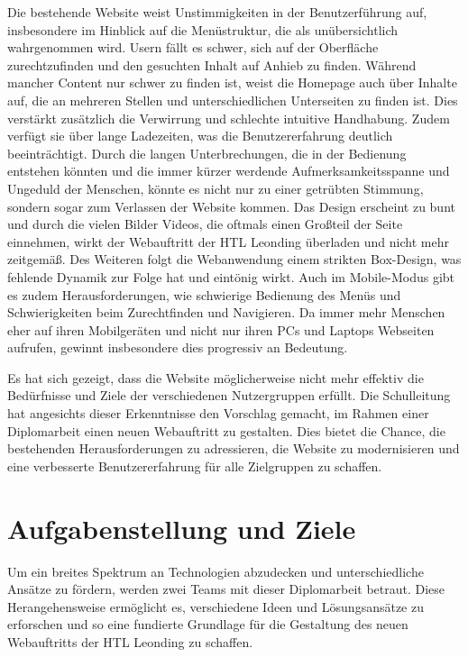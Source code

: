Die bestehende Website weist Unstimmigkeiten in der Benutzerführung auf, 
insbesondere im Hinblick auf die Menüstruktur, die als unübersichtlich wahrgenommen wird. 
Usern fällt es schwer, sich auf der Oberfläche zurechtzufinden und den gesuchten Inhalt auf Anhieb zu finden. 
Während mancher Content nur schwer zu finden ist, weist die Homepage auch über Inhalte auf, 
die an mehreren Stellen und unterschiedlichen Unterseiten zu finden ist. Dies verstärkt zusätzlich 
die Verwirrung und schlechte intuitive Handhabung. Zudem verfügt sie über lange Ladezeiten, was die 
Benutzererfahrung deutlich beeinträchtigt. Durch die langen Unterbrechungen, 
die in der Bedienung entstehen könnten und die immer kürzer werdende Aufmerksamkeitsspanne und Ungeduld der Menschen, 
könnte es nicht nur zu einer getrübten Stimmung, sondern sogar zum Verlassen der Website kommen. Das Design erscheint 
zu bunt und durch die vielen Bilder Videos, die oftmals einen Großteil der Seite einnehmen, 
wirkt der Webauftritt der HTL Leonding überladen und nicht mehr zeitgemäß. Des Weiteren folgt die Webanwendung einem strikten
Box-Design, was fehlende Dynamik zur Folge hat und eintönig wirkt. Auch im Mobile-Modus gibt es zudem Herausforderungen,
wie schwierige Bedienung des Menüs und Schwierigkeiten beim Zurechtfinden und Navigieren. Da immer mehr Menschen eher auf 
ihren Mobilgeräten und nicht nur ihren PCs und Laptops Webseiten aufrufen, gewinnt insbesondere dies progressiv an Bedeutung.

Es hat sich gezeigt, dass die Website möglicherweise nicht mehr effektiv die Bedürfnisse und 
Ziele der verschiedenen Nutzergruppen erfüllt. Die Schulleitung hat angesichts dieser Erkenntnisse den Vorschlag gemacht, 
im Rahmen einer Diplomarbeit einen neuen Webauftritt zu gestalten. Dies bietet die Chance, die bestehenden 
Herausforderungen zu adressieren, die Website zu modernisieren und eine verbesserte Benutzererfahrung für alle Zielgruppen zu schaffen.


\section{Aufgabenstellung und Ziele}

Um ein breites Spektrum an Technologien abzudecken und unterschiedliche Ansätze zu fördern, werden zwei Teams mit dieser Diplomarbeit betraut. 
Diese Herangehensweise ermöglicht es, verschiedene Ideen und Lösungsansätze zu erforschen und so eine fundierte Grundlage für die Gestaltung 
des neuen Webauftritts der HTL Leonding zu schaffen.

